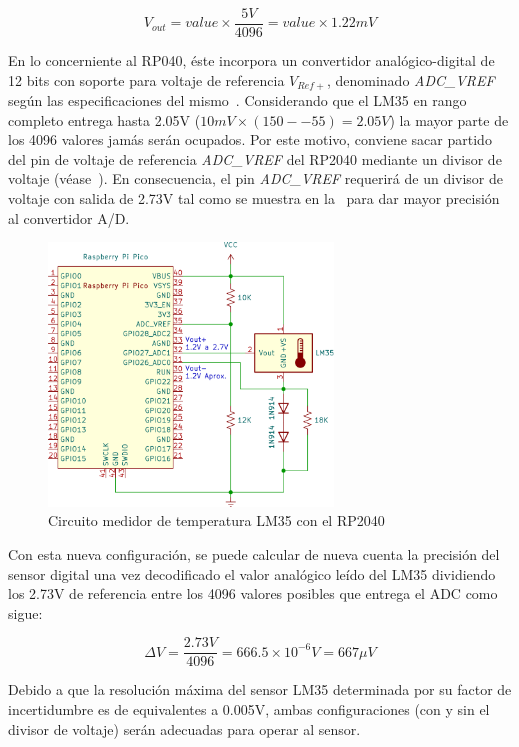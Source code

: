 \begin{equation}
V_{out}= value \times \frac{ 5V }{ 4096 } = value \times 1.22mV
\end{equation}

En lo concerniente al RP040, éste incorpora un convertidor analógico-digital de 12 bits con soporte para voltaje de referencia $V_{Ref+}$, denominado \emph{ADC\_VREF} según las especificaciones del mismo~.
Considerando que el LM35 en rango completo entrega hasta 2.05V ($10mV\times (150 - -55) = 2.05V$) la mayor parte de los 4096 valores jamás serán ocupados.
Por este motivo, conviene sacar partido del pin de voltaje de referencia \emph{ADC\_VREF} del RP2040 mediante un divisor de voltaje (véase~).
En consecuencia, el pin \emph{ADC\_VREF} requerirá de un divisor de voltaje con salida de 2.73V tal como se muestra en la~ para dar mayor precisión al convertidor A/D.

\begin{figure}
	\centering
	\includegraphics[width=\textwidth,height=7cm,keepaspectratio]{img/lm35-pico.png}
	\caption{Circuito medidor de temperatura LM35 con el RP2040}
	\label{fig:lm35-pico} %
\end{figure}

Con esta nueva configuración, se puede calcular de nueva cuenta la precisión del sensor digital una vez decodificado el valor analógico leído del LM35 dividiendo los 2.73V de referencia entre los 4096 valores posibles que entrega el ADC como sigue:

\begin{equation}
\Delta V = \frac{ 2.73V }{ 4096 } =  666.5\times10^{-6}V = 667\mu{}V
\end{equation}

Debido a que la resolución máxima del sensor LM35 determinada por su factor de incertidumbre es de  equivalentes a 0.005V, ambas configuraciones (con y sin el divisor de voltaje) serán adecuadas para operar al sensor.
